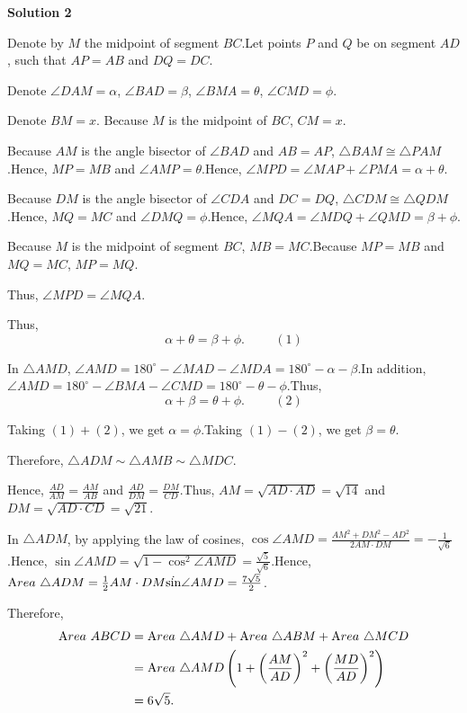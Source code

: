 \begin{enumerate}
\textbf{Solution 2}

Denote by $M$ the midpoint of segment $BC$.Let points $P$ and $Q$ be on segment $AD$, such that $AP = AB$ and $DQ = DC$.

 Denote $\angle DAM = \alpha$, $\angle BAD = \beta$, $\angle BMA = \theta$, $\angle CMD = \phi$.

 Denote $BM = x$. Because $M$ is the midpoint of $BC$, $CM = x$.

 Because $AM$ is the angle bisector of $\angle BAD$ and $AB = AP$, $\triangle BAM \cong \triangle PAM$.Hence, $MP = MB$ and $\angle AMP = \theta$.Hence, $\angle MPD = \angle MAP + \angle PMA = \alpha + \theta$.

 Because $DM$ is the angle bisector of $\angle CDA$ and $DC = DQ$, $\triangle CDM \cong \triangle QDM$.Hence, $MQ = MC$ and $\angle DMQ = \phi$.Hence, $\angle MQA = \angle MDQ + \angle QMD = \beta + \phi$.

 Because $M$ is the midpoint of segment $BC$, $MB = MC$.Because $MP = MB$ and $MQ = MC$, $MP = MQ$.

 Thus, $\angle MPD = \angle MQA$.

 Thus,
 \[ \alpha + \theta = \beta + \phi . \hspace{1cm} (1) \]

 In $\triangle AMD$, $\angle AMD = 180^\circ - \angle MAD - \angle MDA = 180^\circ - \alpha - \beta$.In addition, $\angle AMD = 180^\circ - \angle BMA - \angle CMD = 180^\circ - \theta - \phi$.Thus,
 \[ \alpha + \beta = \theta + \phi . \hspace{1cm} (2) \]

 Taking $(1) + (2)$, we get $\alpha = \phi$.Taking $(1) - (2)$, we get $\beta = \theta$.

 Therefore, $\triangle ADM \sim \triangle AMB \sim \triangle MDC$.

 Hence, $\frac{AD}{AM} = \frac{AM}{AB}$ and $\frac{AD}{DM} = \frac{DM}{CD}$.Thus, $AM = \sqrt{AD \cdot AD} = \sqrt{14}$ and $DM = \sqrt{AD \cdot CD} = \sqrt{21}$.

 In $\triangle ADM$, by applying the law of cosines, $\cos \angle AMD  = \frac{AM^2 + DM^2 - AD^2}{2 AM \cdot DM} = - \frac{1}{\sqrt{6}}$.Hence, $\sin \angle AMD = \sqrt{1 - \cos^2 \angle AMD} = \frac{\sqrt{5}}{\sqrt{6}}$.Hence, ${\textrm Area} \ \triangle ADM = \frac{1}{2} AM \cdot DM \dot \sin \angle AMD = \frac{7 \sqrt{5}}{2}$.

 Therefore,
 \begin{align*} {\textrm Area} \ ABCD & = {\textrm Area} \ \triangle AMD + {\textrm Area} \ \triangle ABM + {\textrm Area} \ \triangle MCD \\ & = {\textrm Area} \ \triangle AMD \left( 1 + \left( \frac{AM}{AD} \right)^2 + \left( \frac{MD}{AD} \right)^2 \right) \\ & = 6 \sqrt{5} . \end{align*}



\end{enumerate}
